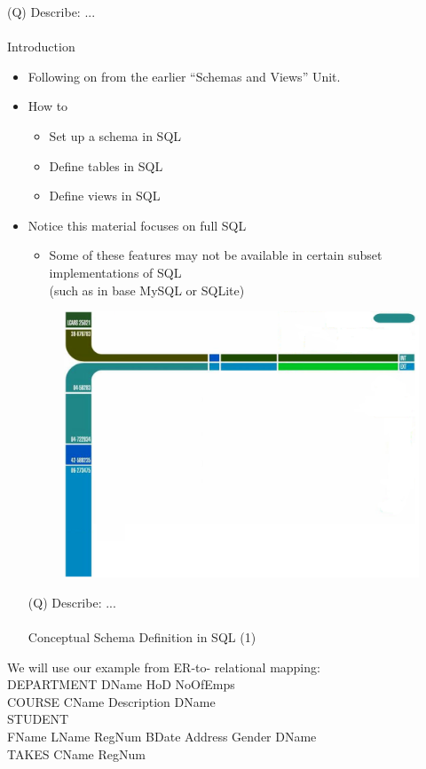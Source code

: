 \documentclass[12pt]{article}
\begin{document}
\clearpage
(Q)
Describe: ...
\\ 
 \\
Introduction\\
\begin{itemize}
  \item Following on from the earlier “Schemas and 
Views” Unit.\\
  \item How to
\begin{itemize}
  \item Set up a schema in SQL
  \item Define tables in SQL
  \item Define views in SQL
\end{itemize}
  \item Notice this material focuses on full SQL
\begin{itemize}
  \item Some of these features may not be available in 
certain subset implementations of SQL\\
(such as in base MySQL or SQLite)\\
\end{itemize}
\begin{figure}[H]
\includegraphics[width=0.5\linewidth]{page4-image-1.png}
\end{figure}
\clearpage
(Q)
Describe: ...
\\ 
 \\
Conceptual Schema Definition in SQL (1)\\
\end{itemize}
  \item We will use our example from ER-to-
relational mapping:\\
DEPARTMENT DName HoD NoOfEmps\\
COURSE CName Description DName\\
STUDENT\\
FName LName RegNum BDate Address Gender DName\\
TAKES CName RegNum\\
\end{document}
